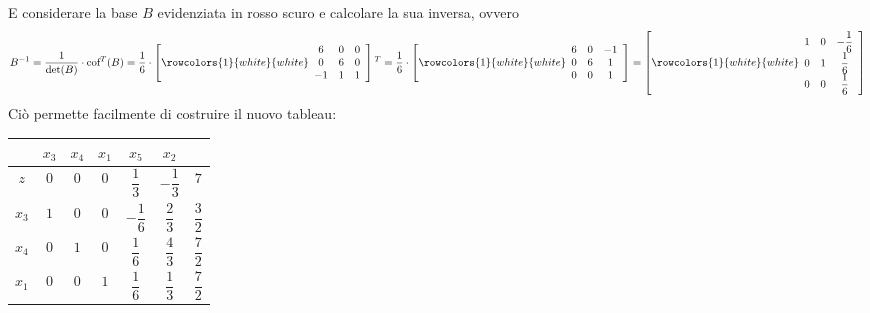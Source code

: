 \documentclass[a4paper]{extarticle}
\renewcommand\arraystretch{}
\begin{document}
\vspace{1em}
\noindent
E considerare la base $B$ evidenziata in \textcolor{red!50!white}{rosso scuro} e calcolare la sua inversa, ovvero
\[B^{-1}=\frac{1}{\det(B)} \cdot \text{cof}{^T}(B)=\frac{1}{6} \cdot \left[
    \rowcolors{1}{white}{white}
    \begin{array}{ccc}
        6 & 0 & 0\\
        0 & 6 & 0\\
        -1 & 1 & 1
    \end{array}
\right]{^T} = \frac{1}{6} \cdot \left[
    \rowcolors{1}{white}{white}
    \begin{array}{ccc}
        6 & 0 & -1\\
        0 & 6 & 1\\
        0 & 0 & 1
    \end{array}
\right] = \left[
    \rowcolors{1}{white}{white}
    \begin{array}{ccc}
        1 & 0 & -\dfrac{1}{6}\\
        0 & 1 & \dfrac{1}{6}\\
        0 & 0 & \dfrac{1}{6}
    \end{array}
\right]\]
Ciò permette facilmente di costruire il nuovo tableau:

\vspace{1em}
\noindent
\begin{table}[H]
    \setlength{\tabcolsep}{4pt}
    \renewcommand{\arraystretch}{2.2}
    \noindent
    \centering
    \begin{tabular}{|c|ccc|cc|c|}
        & $x_3$ & $x_4$ & $x_1$ & $x_5$ & $x_2$ &\\
        \hline
        $z$ & $0$ & $0$ & $0$ & $\dfrac{1}{3}$ & $-\dfrac{1}{3}$ & $7$\\
        \hline
        $x_3$ & \cellcolor{red!50!white}$1$ & \cellcolor{red!50!white}$0$ & \cellcolor{red!50!white}$0$ & \cellcolor{blue!50!white}$-\dfrac{1}{6}$ & \cellcolor{blue!50!white}$\dfrac{2}{3}$ & \cellcolor{orange!25!white}$\dfrac{3}{2}$\\
        $x_4$ & \cellcolor{red!50!white}$0$ & \cellcolor{red!50!white}$1$ & \cellcolor{red!50!white}$0$ & \cellcolor{blue!50!white}$\dfrac{1}{6}$ & \cellcolor{blue!50!white}$\dfrac{4}{3}$ & \cellcolor{orange!25!white}$\dfrac{7}{2}$\\
        $x_1$ & \cellcolor{red!50!white}$0$ & \cellcolor{red!50!white}$0$ & \cellcolor{red!50!white}$1$ & \cellcolor{blue!50!white}$\dfrac{1}{6}$ & \cellcolor{blue!50!white}$\dfrac{1}{3}$ & \cellcolor{orange!25!white}$\dfrac{7}{2}$\\
        \hline
    \end{tabular}
\end{table}
\end{document}
